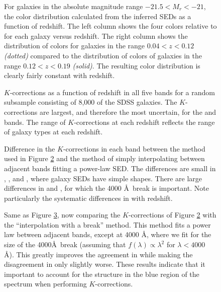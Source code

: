 \clearpage
{}
\begin{figure}
\figurenum{\fignum}
\caption{\label{colors.sample8b15} For galaxies in the absolute
magnitude range $-21.5<M_r<-21$, the color distribution calculated
from the inferred SEDs as a function of redshift. The left column
shows the four colors relative to  for each galaxy versus
redshift. The right column shows the distribution of colors for
galaxies in the range $0.04<z<0.12$ {\it (dotted)} compared to the
distribution of colors of galaxies in the range $0.12<z<0.19$ {\it
(solid)}. The resulting color distribution is clearly fairly constant
with redshift.}
\end{figure}

\clearpage
{}
\begin{figure}
\figurenum{\fignum}
\caption{\label{kcorrect.sample8b15} $K$-corrections as a function of
redshift in all five bands for a random subsample consisting of 8,000
of the SDSS galaxies. The $K$-corrections are largest, and therefore
the most uncertain, for the  and  bands. The
range of $K$-corrections at each redshift reflects the range of galaxy
types at each redshift.}
\end{figure}

\clearpage
{}
\begin{figure}
\figurenum{\fignum}
\caption{\label{ciCompare.sample8b15} Difference in the
$K$-corrections in each band between the method used in Figure
\ref{kcorrect.sample8b15} and the method of simply interpolating
between adjacent bands fitting a power-law SED. The differences are
small in , , and , where galaxy
SEDs have simple shapes. There are large differences in 
and , for which the 4000 \AA\ break is important. Note
particularly the systematic differences in  with
redshift.}
\end{figure}

\clearpage
{}
\begin{figure}
\figurenum{\fignum}
\caption{\label{cibreakCompare.sample8b15} Same as Figure
\ref{ciCompare.sample8b15}, now comparing the $K$-corrections of Figure
\ref{kcorrect.sample8b15} with the ``interpolation with a break''
method. This method fits a power law between adjacent bands, except at
4000 \AA, where we fit for the size of the 4000\AA\ break (assuming
that $f(\lambda)\propto \lambda^2$ for $\lambda<4000$ \AA). This
greatly improves the agreement in  while making the
disagreement in  only slightly worse. These results
indicate that it important to account for the structure in the blue
region of the spectrum when performing $K$-corrections.}
\end{figure}

